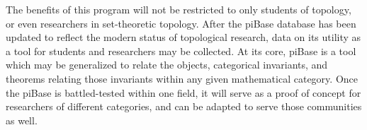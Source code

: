   The benefits of this program will not be restricted to only students of
  topology, or even researchers in set-theoretic topology. After the
  piBase database has been updated to reflect the modern status of topological
  research, data on its utility as a tool for students and researchers may
  be collected. At its core, piBase is a tool which may be generalized
  to relate the objects, categorical invariants, and theorems relating those
  invariants within any given mathematical category. Once the piBase is
  battled-tested within one field, it will serve as a proof of concept for
  researchers of different categories, and can be adapted to serve those
  communities as well.

%
